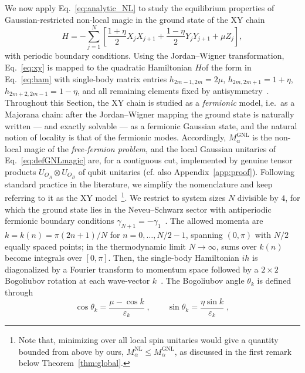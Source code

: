 \documentclass[prx,twocolumn,superscriptaddress,aps,10pt, frontmatterverbose, reprint,footinbib,longbibliography=true]{revtex4-2}
\newcommand{\RENYI}{\alpha}
\providecommand{\DIFaddtex}[1]{{\protect\color{red}\uwave{#1}}} %
\providecommand{\DIFdeltex}[1]{{\protect\color{red}\sout{#1}}}                      %
\providecommand{\DIFaddbegin}{\protect\color{red}} %
\providecommand{\DIFaddend}{\protect\color{black}} %
\providecommand{\DIFdelbegin}{} %
\providecommand{\DIFdelend}{} %
\providecommand{\DIFadd}[1]{\texorpdfstring{\DIFaddtex{#1}}{#1}} %
\providecommand{\DIFdel}[1]{\texorpdfstring{\DIFdeltex{#1}}{}} %
\newcommand{\DIFscaledelfig}{0.5}
\newlength{\DIFdelgraphicswidth} %
\newlength{\DIFdelgraphicsheight} %
\newcommand{\DIFaddincludegraphics}[2][]{{\color{blue}\fbox{\DIFOincludegraphics[#1]{#2}}}} %
\newcommand{\DIFdelincludegraphics}[2][]{%
\sbox{\DIFdelgraphicsbox}{\DIFOincludegraphics[#1]{#2}}%
\settoboxwidth{\DIFdelgraphicswidth}{\DIFdelgraphicsbox} %
\settoboxtotalheight{\DIFdelgraphicsheight}{\DIFdelgraphicsbox} %
\scalebox{\DIFscaledelfig}{%
\parbox[b]{\DIFdelgraphicswidth}{\usebox{\DIFdelgraphicsbox}\\[-\baselineskip] \rule{\DIFdelgraphicswidth}{0em}}\llap{\resizebox{\DIFdelgraphicswidth}{\DIFdelgraphicsheight}{%
\setlength{\unitlength}{\DIFdelgraphicswidth}%
\begin{picture}(1,1)%
\thicklines\linethickness{2pt} %
{\color[rgb]{1,0,0}\put(0,0){\framebox(1,1){}}}%
{\color[rgb]{1,0,0}\put(0,0){\line( 1,1){1}}}%
{\color[rgb]{1,0,0}\put(0,1){\line(1,-1){1}}}%
\end{picture}%
}\hspace*{3pt}}} %
} %
\DeclareRobustCommand{\DIFaddbegin}{\DIFOaddbegin \let\includegraphics\DIFaddincludegraphics} %
\DeclareRobustCommand{\DIFaddend}{\DIFOaddend \let\includegraphics\DIFOincludegraphics} %
\DeclareRobustCommand{\DIFdelbegin}{\DIFOdelbegin \let\includegraphics\DIFdelincludegraphics} %
\DeclareRobustCommand{\DIFdelend}{\DIFOaddend \let\includegraphics\DIFOincludegraphics} %
\begin{document}
We now apply Eq.~\eqref{eq:analytic_NL} to study the equilibrium properties of Gaussian-restricted non-local magic in the ground state of the XY chain
\begin{equation}
    H = -\sum_{j=1}^{N}\!\left[\frac{1+\eta}{2}X_j X_{j+1} + \frac{1-\eta}{2}Y_j Y_{j+1} + \mu Z_j\right],
    \label{eq:xy}
\end{equation}
with periodic boundary conditions.
Using the Jordan--Wigner transformation, Eq.~\eqref{eq:xy} is mapped to the quadratic Hamiltonian $H$of the form in Eq.~\eqref{eq:ham} with single-body matrix entries $h_{2m-1,2m} = 2\mu$, $h_{2m,2m+1} = 1+\eta$, $h_{2m+2,2m-1} = 1-\eta$, and all remaining elements fixed by antisymmetry~\cite{Mbeng2024}. 
Throughout this Section, the XY chain is studied as a \emph{fermionic} model, i.e.\ as a Majorana chain: after the Jordan--Wigner mapping the ground state is naturally written --- and exactly solvable --- as a fermionic Gaussian state, and the natural notion of locality is that of the fermionic modes. 
Accordingly, $M_\RENYI^{\mathrm{GNL}}$ is the non-local magic of the \textit{free-fermion problem}, and the local Gaussian unitaries of Eq.~\eqref{eq:defGNLmagic} are, for a contiguous cut, implemented by genuine tensor products $U_{O_A}\otimes U_{O_B}$ of qubit unitaries (cf. also Appendix~\ref{app:proof}).
Following standard practice in the literature, we simplify the nomenclature and keep referring to it as the XY model~\footnote{Note that, minimizing over all local spin unitaries would give a quantity bounded from above by ours, $M_\RENYI^{\mathrm{NL}}\le M_\RENYI^{\mathrm{GNL}}$, as discussed in the first remark below Theorem~\ref{thm:global}.}. 
We restrict to system sizes $N$ divisible by $4$, for which the ground state lies in the Neveu--Schwarz sector with antiperiodic fermionic boundary
conditions \DIFdelbegin \DIFdel{$\gamma_{N+1}=-\gamma_1$}\DIFdelend \DIFaddbegin \DIFadd{$c_{N+1}=-c_1$, i.e., $\gamma_{2N+1}=-\gamma_1$ and $\gamma_{2N+2}=-\gamma_2$}\DIFaddend ~\cite{Mbeng2024}.
The allowed momenta are 
$k=k(n)= \pi(2n+1)/N$ for $n = 0,\dots, N/2-1$, 
spanning $(0,\pi)$ with $N/2$ equally spaced points; 
in the thermodynamic limit $N\to\infty$, sums over $k(n)$ 
become integrals over $[0,\pi]$.
Then, the single-body Hamiltonian $ih$ is diagonalized by a Fourier transform to momentum space followed by a $2\times 2$ Bogoliubov rotation at each wave-vector $k$~\cite{Mbeng2024}.
The Bogoliubov angle $\theta_k$ is defined through
\begin{equation}
    \cos\theta_k = \frac{\mu - \cos k}{\varepsilon_k}\;,\qquad \sin\theta_k = \frac{\eta\sin k}{\varepsilon_k}\;,
    \label{eq:bogoliubov_angle}
\end{equation}
\end{document}

